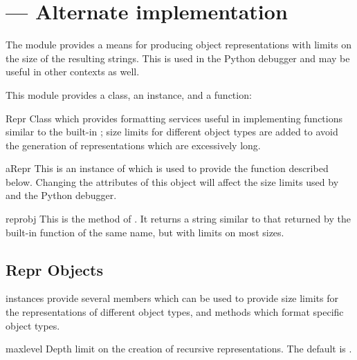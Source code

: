 \section{ ---
         Alternate  implementation}



The  module provides a means for producing object
representations with limits on the size of the resulting strings.
This is used in the Python debugger and may be useful in other
contexts as well.

This module provides a class, an instance, and a function:


\begin{classdesc}{Repr}{}
  Class which provides formatting services useful in implementing
  functions similar to the built-in ; size limits for 
  different object types are added to avoid the generation of
  representations which are excessively long.
\end{classdesc}


\begin{datadesc}{aRepr}
  This is an instance of  which is used to provide the
   function described below.  Changing the attributes
  of this object will affect the size limits used by 
  and the Python debugger.
\end{datadesc}


\begin{funcdesc}{repr}{obj}
  This is the  method of .  It returns a
  string similar to that returned by the built-in function of the same 
  name, but with limits on most sizes.
\end{funcdesc}


\subsection{Repr Objects \label{Repr-objects}}

 instances provide several members which can be used to
provide size limits for the representations of different object types, 
and methods which format specific object types.


\begin{memberdesc}{maxlevel}
  Depth limit on the creation of recursive representations.  The
  default is .
\end{memberdesc}

